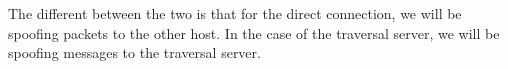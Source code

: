 \documentclass[conference]{IEEEtran}
\begin{document}
The different between the two is that for the direct connection, we will be spoofing packets to the other host. In the case of the traversal server, we will be spoofing messages to the traversal server.
%
%



%
%
\end{document}
